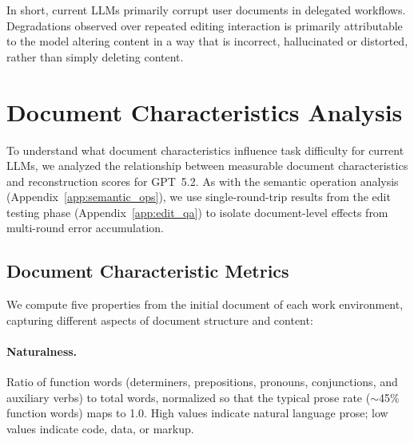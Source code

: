 \documentclass{article} %
\begin{document}
In short, current LLMs primarily corrupt user documents in delegated workflows. Degradations observed over repeated editing interaction is primarily attributable to the model altering content in a way that is incorrect, hallucinated or distorted, rather than simply deleting content.

\section{Document Characteristics Analysis} \label{app:domain_chars}

To understand what document characteristics influence task difficulty for current LLMs, we analyzed the relationship between measurable document characteristics and reconstruction scores for GPT~5.2. As with the semantic operation analysis (Appendix~\ref{app:semantic_ops}), we use single-round-trip results from the edit testing phase (Appendix~\ref{app:edit_qa}) to isolate document-level effects from multi-round error accumulation.

\subsection{Document Characteristic Metrics}

\begin{table}
    \vspace{-1\intextsep}
    \centering
    
    \caption{Category-level document characteristics and mean reconstruction scores (GPT~5.2, single round trips). LLMs perform best in Science \& Engineering domains (97.3\%) and worst in Everyday domains (89.9\%).}
    \label{tab:domain_characteristics}
    \vspace{-1\intextsep}
\end{table}

We compute five properties from the initial document of each work environment, capturing different aspects of document structure and content:

\paragraph{Naturalness.} Ratio of function words (determiners, prepositions, pronouns, conjunctions, and auxiliary verbs) to total words, normalized so that the typical prose rate (${\sim}$45\% function words) maps to 1.0. High values indicate natural language prose; low values indicate code, data, or markup.
\end{document}
